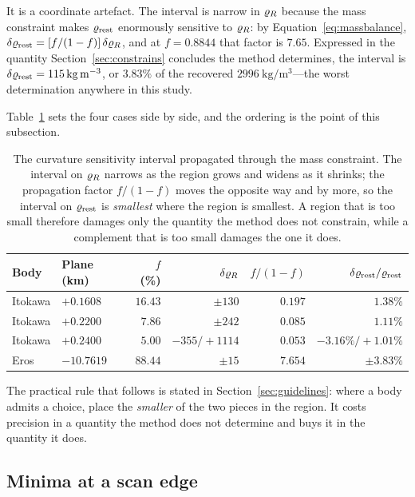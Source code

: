 It is a coordinate artefact. The interval is narrow in $\varrho_{R}$ because
the mass constraint makes $\varrho_{\mathrm{rest}}$ enormously sensitive to $\varrho_{R}$:
by Equation~\eqref{eq:massbalance},
$\delta\varrho_{\mathrm{rest}} = [f/(1-f)]\,\delta\varrho_{R}$, and at $f = 0.8844$ that
factor is $7.65$. Expressed in the quantity
Section~\ref{sec:constrains} concludes the method determines, the
interval is
$\delta\varrho_{\mathrm{rest}} = \SI{115}{\kilo\gram\per\cubic\metre}$, or $3.83\%$ of
the recovered $\SI{2996}{\kilo\gram\per\cubic\metre}$---the worst
determination anywhere in this study.

Table~\ref{tab:propagated} sets the four cases side by side, and the
ordering is the point of this subsection.

\begin{table}[htbp]
\centering
\small
\caption{The curvature sensitivity interval propagated through the mass
constraint. The interval on $\varrho_{R}$ narrows as the region grows and
widens as it shrinks; the propagation factor $f/(1-f)$ moves the opposite
way and by more, so the interval on $\varrho_{\mathrm{rest}}$ is \emph{smallest} where
the region is smallest. A region that is too small therefore damages only
the quantity the method does not constrain, while a complement that is
too small damages the one it does.}
\label{tab:propagated}
\setlength{\tabcolsep}{10pt}
\begin{tabular}{llrrrr}
\toprule
Body & Plane (km) & $f$ (\%) & $\delta\varrho_{R}$ & $f/(1-f)$
 & $\delta\varrho_{\mathrm{rest}}/\varrho_{\mathrm{rest}}$ \\
\midrule
Itokawa & $+0.1608$  & $16.43$ & $\pm130$        & $0.197$ & $1.38\%$ \\
Itokawa & $+0.2200$  & $7.86$  & $\pm242$        & $0.085$ & $1.11\%$ \\
Itokawa & $+0.2400$  & $5.00$  & $-355/+1114$    & $0.053$ & $-3.16\%/+1.01\%$ \\
Eros    & $-10.7619$ & $88.44$ & $\pm15$         & $7.654$ & $\pm3.83\%$ \\
\bottomrule
\end{tabular}
\end{table}

The practical rule that follows is stated in
Section~\ref{sec:guidelines}: where a body admits a choice, place the
\emph{smaller} of the two pieces in the region. It costs precision in a
quantity the method does not determine and buys it in the quantity it
does.

\subsection{Minima at a scan edge}
\label{sec:failures:edge}

